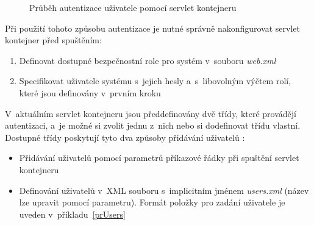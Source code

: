                 \begin{figure}[h!t]
                    \begin{center}
                        \caption{Průběh autentizace uživatele pomocí servlet kontejneru}
                        \label{imgSecurity}
                    \end{center}
                \end{figure}

                Při použití tohoto způsobu autentizace je nutné správně nakonfigurovat servlet kontejner před spuštěním:
                
                \begin{enumerate}
                    \item Definovat dostupné bezpečnostní role pro systém v~souboru \emph{web.xml}
                    \item Specifikovat uživatele systému s~jejich hesly a~s~libovolným výčtem rolí, které
                        jsou definovány v~prvním kroku
                \end{enumerate}

                V~aktuálním servlet kontejneru jsou předdefinovány dvě třídy, které provádějí autentizaci,
                a~je možné si zvolit jednu z~nich nebo si dodefinovat třídu vlastní.
                Dostupné třídy poskytují tyto dva způsoby přidávání uživatelů \cite{securityArchitectureWinstone}:

                \begin{itemize}
                    \item Přidávání uživatelů pomocí parametrů příkazové řádky při spuštění servlet kontejneru 
                    \item Definování uživatelů v~XML souboru s~implicitním jménem \emph{users.xml} (název
                    lze upravit pomocí parametru). Formát položky
                        pro zadání uživatele je uveden v~příkladu~\ref{prUsers}
                \end{itemize}

